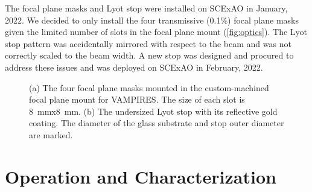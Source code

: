 \documentclass[]{spie}  %
\begin{document}
The focal plane masks and Lyot stop were installed on SCExAO in January, 2022. We decided to only install the four  transmissive (0.1\%) focal plane masks given the limited number of slots in the focal plane mount (\autoref{fig:optics}). The Lyot stop pattern was accidentally mirrored with respect to the beam and was not correctly scaled to the beam width. A new stop was designed and procured to address these issues and was deployed on SCExAO in February, 2022.

\begin{figure}
   \centering
   \hspace{0.5in}
   \caption{(a) The four focal plane masks mounted in the custom-machined focal plane mount for VAMPIRES. The size of each slot is \qty{8}{\milli\meter}x\qty{8}{\milli\meter}. (b) The undersized Lyot stop with its reflective gold coating. The diameter of the glass substrate and stop outer diameter are marked.}\label{fig:optics}
\end{figure}

\section{Operation and Characterization}\label{sec:tests}
\end{document}
